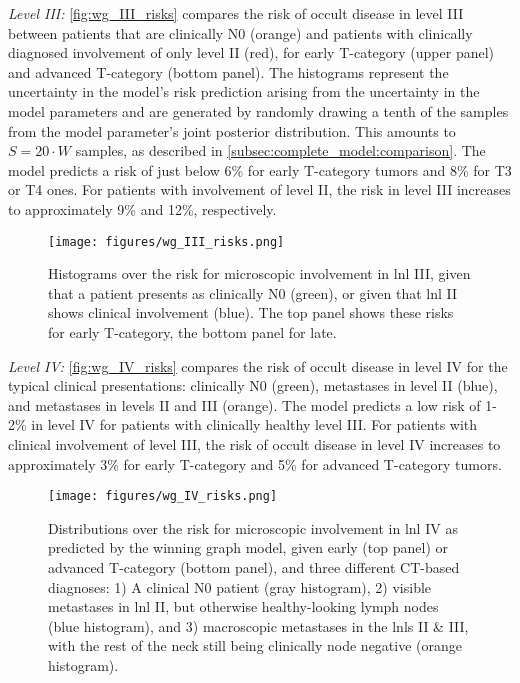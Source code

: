 \documentclass[twocolumn]{aastex631}
\begin{document}
{\it Level III:} \autoref{fig:wg_III_risks} compares the risk of occult disease in level III between patients that are clinically N0 (orange) and patients with clinically diagnosed involvement of only level II (red), for early T-category (upper panel) and advanced T-category (bottom panel). The histograms represent the uncertainty in the model's risk prediction arising from the uncertainty in the model parameters and are generated by randomly drawing a tenth of the samples from the model parameter's joint posterior distribution. This amounts to $S = 20 \cdot W$ samples, as described in \autoref{subsec:complete_model:comparison}. The model predicts a risk of just below 6\% for early T-category tumors and 8\% for T3 or T4 ones. For patients with involvement of level II, the risk in level III increases to approximately 9\% and 12\%, respectively.

\begin{figure}
    \begin{centering}
        \texttt{[image: figures/wg\_III\_risks.png]}
        \caption{Histograms over the risk for microscopic involvement in \gls{lnl} III, given that a patient presents as clinically N0 (green), or given that \gls{lnl} II shows clinical involvement (blue). The top panel shows these risks for early T-category, the bottom panel for late. \label{fig:wg_III_risks}}
    \end{centering}
\end{figure}

{\it Level IV:} \autoref{fig:wg_IV_risks} compares the risk of occult disease in level IV for the typical clinical presentations: clinically N0 (green), metastases in level II (blue), and metastases in levels II and III (orange). The model predicts a low risk of 1-2\% in level IV for patients with clinically healthy level III. For patients with clinical involvement of level III, the risk of occult disease in level IV increases to approximately 3\% for early T-category and 5\% for advanced T-category tumors.

\begin{figure}
    \begin{centering}
        \texttt{[image: figures/wg\_IV\_risks.png]}
        \caption{Distributions over the risk for microscopic involvement in \gls{lnl} IV as predicted by the winning graph model, given early (top panel) or advanced T-category (bottom panel), and three different CT-based diagnoses: 1) A clinical N0 patient (gray histogram), 2) visible metastases in \gls{lnl} II, but otherwise healthy-looking lymph nodes (blue histogram), and 3) macroscopic metastases in the \glspl{lnl} II \& III, with the rest of the neck still being clinically node negative (orange histogram).\label{fig:wg_IV_risks}}
    \end{centering}
\end{figure}
\end{document}
